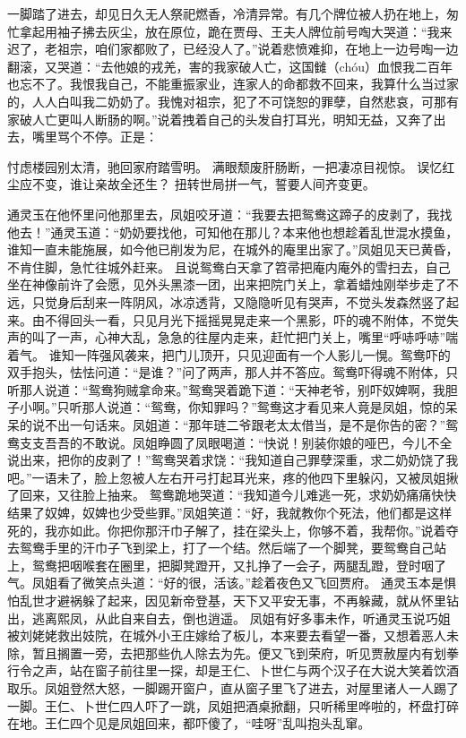 \documentclass[12pt,oneside]{book}
\begin{document}
一脚踏了进去，却见日久无人祭祀燃香，冷清异常。有几个牌位被人扔在地上，匆忙拿起用袖子拂去灰尘，放在原位，跪在贾母、王夫人牌位前号啕大哭道：“我来迟了，老祖宗，咱们家都败了，已经没人了。”说着悲愤难抑，在地上一边号啕一边翻滚，又哭道：“去他娘的戎羌，害的我家破人亡，这国雠（chóu）血恨我二百年也忘不了。我恨我自己，不能重振家业，连家人的命都救不回来，我算什么当过家的，人人白叫我二奶奶了。我愧对祖宗，犯了不可饶恕的罪孽，自然悲哀，可那有家破人亡更叫人断肠的啊。”说着拽着自己的头发自打耳光，明知无益，又奔了出去，嘴里骂个不停。正是：

忖虑楼园别太清，驰回家府踏雪明。
满眼颓废肝肠断，一把凄凉目视惊。
误忆红尘应不变，谁让亲故全还生？
扭转世局拼一气，誓要人间齐变更。

通灵玉在他怀里问他那里去，凤姐咬牙道：“我要去把鸳鸯这蹄子的皮剥了，我找他去！”通灵玉道：“奶奶要找他，可知他在那儿？本来他也想趁着乱世混水摸鱼，谁知一直未能施展，如今他已削发为尼，在城外的庵里出家了。”凤姐见天已黄昏，不肯住脚，急忙往城外赶来。
且说鸳鸯白天拿了笤帚把庵内庵外的雪扫去，自己坐在神像前许了会愿，见外头黑漆一团，出来把院门关上，拿着蜡烛刚举步走了不远，只觉身后刮来一阵阴风，冰凉透背，又隐隐听见有哭声，不觉头发森然竖了起来。由不得回头一看，只见月光下摇摇晃晃走来一个黑影，吓的魂不附体，不觉失声的叫了一声，心神大乱，急急的往屋内走来，赶忙把门关上，嘴里“呼哧呼哧”喘着气。
谁知一阵强风袭来，把门儿顶开，只见迎面有一个人影儿一愰。鸳鸯吓的双手抱头，怯怯问道：“是谁？”问了两声，那人并不答应。鸳鸯吓得魂不附体，只听那人说道：“鸳鸯狗贼拿命来。”鸳鸯哭着跪下道：“天神老爷，别吓奴婢啊，我胆子小啊。”只听那人说道：“鸳鸯，你知罪吗？”鸳鸯这才看见来人竟是凤姐，惊的呆呆的说不出一句话来。凤姐道：“那年琏二爷跟老太太借当，是不是你告的密？”鸳鸯支支吾吾的不敢说。凤姐睁圆了凤眼喝道：“快说！别装你娘的哑巴，今儿不全说出来，把你的皮剥了！”鸳鸯哭着求饶：“我知道自己罪孽深重，求二奶奶饶了我吧。”一语未了，脸上忽被人左右开弓打起耳光来，疼的他四下里躲闪，又被凤姐揪了回来，又往脸上抽来。
鸳鸯跪地哭道：“我知道今儿难逃一死，求奶奶痛痛快快结果了奴婢，奴婢也少受些罪。”凤姐笑道：“好，我就教你个死法，他们都是这样死的，我亦如此。你把你那汗巾子解了，挂在梁头上，你够不着，我帮你。”说着夺去鸳鸯手里的汗巾子飞到梁上，打了一个结。然后端了一个脚凳，要鸳鸯自己站上，鸳鸯把咽喉套在圈里，把脚凳蹬开，又扎挣了一会子，两腿乱蹬，登时咽了气。凤姐看了微笑点头道：“好的很，活该。”趁着夜色又飞回贾府。
通灵玉本是惧怕乱世才避祸躲了起来，因见新帝登基，天下又平安无事，不再躲藏，就从怀里钻出，逃离熙凤，从此自来自去，倒也逍遥。
凤姐有好多事未作，听通灵玉说巧姐被刘姥姥救出妓院，在城外小王庄嫁给了板儿，本来要去看望一番，又想着恶人未除，暂且搁置一旁，去把那些仇人除去为先。便又飞到荣府，听见贾赦屋内有划拳行令之声，站在窗子前往里一探，却是王仁、卜世仁与两个汉子在大说大笑着饮酒取乐。凤姐登然大怒，一脚踢开窗户，直从窗子里飞了进去，对屋里诸人一人踢了一脚。王仁、卜世仁四人吓了一跳，凤姐把酒桌掀翻，只听稀里哗啦的，杯盘打碎在地。王仁四个见是凤姐回来，都吓傻了，“哇呀”乱叫抱头乱窜。
\end{document}
